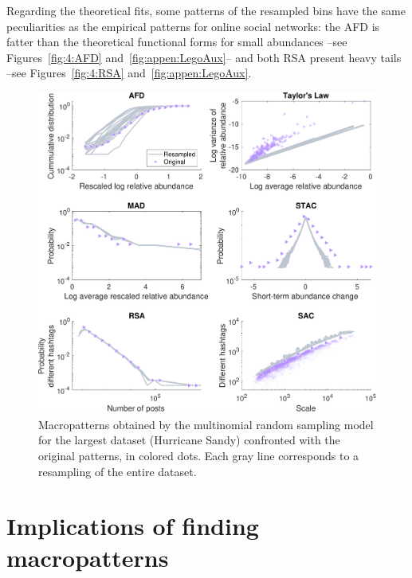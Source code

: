 Regarding the theoretical fits, some  patterns of the resampled bins have the same  peculiarities as the empirical patterns for online social networks: the AFD is fatter than the theoretical functional forms for small abundances --see Figures~\ref{fig:4:AFD} and~\ref{fig:appen:LegoAux}-- and both RSA present heavy tails --see Figures~\ref{fig:4:RSA} and~\ref{fig:appen:LegoAux}. \\


\begin{figure}[t]
    \centering
    \includegraphics[width=\textwidth]{figures/chp4/Figure_Lego_Hurricane Sandy_25Apr_lines.pdf}
    \caption[Macropatterns with the multinomial random sampling model]{Macropatterns obtained by the multinomial random sampling model for the largest dataset (Hurricane Sandy) confronted with the original patterns, in colored dots. Each gray line corresponds to a resampling of the entire dataset.}
    \label{chp:4:fig:Lego}
\end{figure}

\section{Implications of finding macropatterns}

